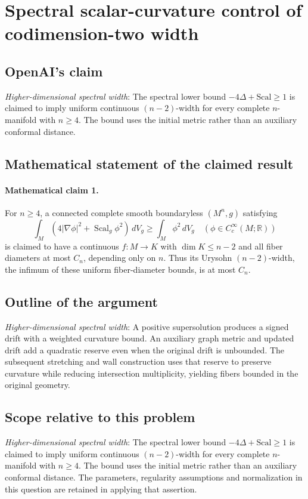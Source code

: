 \documentclass[11pt]{article}
\begin{document}
\section*{Spectral scalar-curvature control of codimension-two width}

\subsection{OpenAI's claim}
\textit{Higher-dimensional spectral width}: The spectral lower bound $-4\Delta+\mathrm{Scal}\ge1$ is claimed to imply uniform continuous $(n-2)$-width for every complete $n$-manifold with $n\ge4$. The bound uses the initial metric rather than an auxiliary conformal distance.

\subsection{Mathematical statement of the claimed result}
\paragraph{Mathematical claim 1.} For $n\ge4$, a connected complete smooth boundaryless $(M^n,g)$ satisfying \[\int_M(4|\nabla\phi|^2+\operatorname{Scal}_g\phi^2)\,dV_g\ge\int_M\phi^2\,dV_g\quad(\phi\in C_c^\infty(M;\mathbb R))\] is claimed to have a continuous $f:M\to K$ with $\dim K\le n-2$ and all fiber diameters at most $C_n$, depending only on $n$. Thus its Urysohn $(n-2)$-width, the infimum of these uniform fiber-diameter bounds, is at most $C_n$.

\subsection{Outline of the argument}
\textit{Higher-dimensional spectral width}: A positive supersolution produces a signed drift with a weighted curvature bound. An auxiliary graph metric and updated drift add a quadratic reserve even when the original drift is unbounded. The subsequent stretching and wall construction uses that reserve to preserve curvature while reducing intersection multiplicity, yielding fibers bounded in the original geometry.

\subsection{Scope relative to this problem}
\textit{Higher-dimensional spectral width}: The spectral lower bound $-4\Delta+\mathrm{Scal}\ge1$ is claimed to imply uniform continuous $(n-2)$-width for every complete $n$-manifold with $n\ge4$. The bound uses the initial metric rather than an auxiliary conformal distance. The parameters, regularity assumptions and normalization in this question are retained in applying that assertion.
\end{document}
